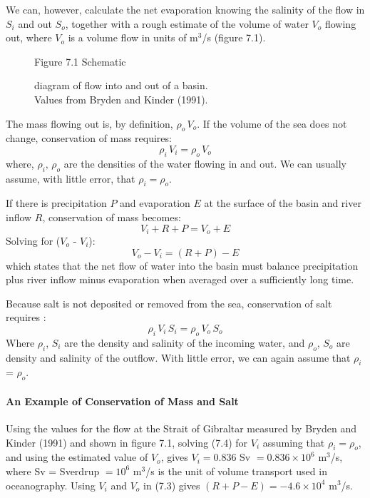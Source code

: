 We can, however, calculate the net evaporation knowing the salinity of the flow
in $S_i$ and out $S_o$, together with a rough estimate of the volume of water
$V_o$ flowing out, where $V_o$ is a volume flow in units of m$^3$/s (figure 7.1).
\begin{figure}[h!]
\vspace{-1ex}
\centering
\footnotesize
Figure 7.1 Schematic \rule{0mm}{3ex}diagram of flow into and out of a basin.\\Values from Bryden and Kinder (1991).

\label{fig:basin}
\vspace{-1ex}
\end{figure}

The mass flowing out is, by definition, $\rho_o \, V_o$. If the volume
of the sea does not change, conservation of mass requires:
\begin{equation}
\rho_i\,V_i = \rho_o\,V_o
\end{equation}
where, $\rho_i, \,\rho_o$ are the densities of the water flowing in and out. We
can usually assume, with little error, that
$\rho_i = \rho_o$.

If there is precipitation $P$ and evaporation $E$ at the
surface of the basin and river inflow $R$, conservation of mass becomes:
\begin{equation}
V_i + R + P = V_o + E
\end{equation}
Solving for ($V_o$ - $V_i$):
\begin{equation}
V_o - V_i = (R + P) - E
\end{equation}
which states that the net flow of water into the basin must balance
precipitation plus river inflow minus evaporation when averaged over a
sufficiently long time.

Because salt is not deposited or removed from the sea, conservation of salt
requires :
\begin{equation}
\rho_i\,V_i\,S_i = \rho_o\,V_o\,S_o
\end{equation}
Where $\rho_i$, $S_i$ are the density and salinity of the incoming water, and
$\rho_o$, $S_o$ are density and salinity of the outflow. With little error,
we can again assume that $\rho_i$ = $\rho_o$.

\paragraph{An Example of Conservation of Mass and Salt}
Using the values for the flow at the Strait of Gibraltar measured by Bryden and Kinder (1991) and shown in figure 7.1, solving (7.4) for $V_i$ assuming that $\rho_i = \rho_o$, and using the estimated value of $V_o$, gives $V_i = 0.836$ Sv $= 0.836 \times 10^6$ m$^3$/s, where Sv = Sverdrup $= 10^6$ m$^3$/s is the unit of volume transport used in oceanography. Using $V_i$ and $V_o$ in (7.3) gives  $(R + P - E) = - 4.6 \times 10^4$ m$^3$/s.

